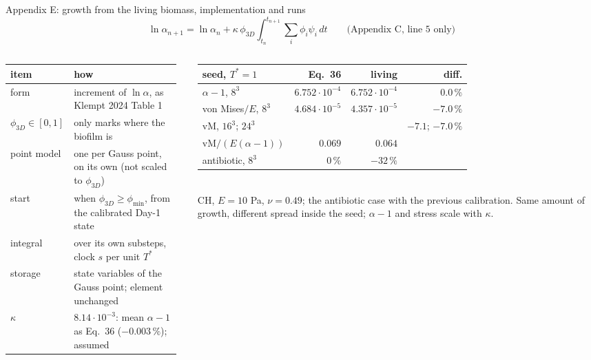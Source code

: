 \documentclass[aspectratio=169,11pt]{beamer}
\begin{document}
\begin{frame}{Appendix E: growth from the living biomass, implementation and runs}
\vspace{-6pt}
\[
\ln\alpha_{n+1}=\ln\alpha_n+\kappa\,\phi_{3D}\!\int_{t_n}^{t_{n+1}}\!\sum_i\phi_i\psi_i\,dt
\qquad\text{(Appendix C, line 5 only)}
\]
\vspace{-4pt}
\begin{columns}[T]
\begin{column}{0.42\textwidth}
\scriptsize\renewcommand{\arraystretch}{1.15}
\begin{tabular}{@{}>{\raggedright}p{0.3\linewidth}>{\raggedright\arraybackslash}p{0.66\linewidth}@{}}
\toprule
item & how\\
\midrule
form & increment of $\ln\alpha$, as Klempt 2024 Table 1\\
$\phi_{3D}\in[0,1]$ & only marks where the biofilm is\\
point model & one per Gauss point, on its own (not scaled to $\phi_{3D}$)\\
start & when $\phi_{3D}\ge\phi_{\min}$, from the calibrated Day-1 state\\
integral & over its own substeps, clock $s$ per unit $T^*$\\
storage & state variables of the Gauss point; element unchanged\\
$\kappa$ & $8.14\cdot10^{-3}$: mean $\alpha-1$ as Eq.\ 36 ($-0.003\,\%$); assumed\\
\bottomrule
\end{tabular}
\end{column}
\begin{column}{0.54\textwidth}
\scriptsize\setlength\tabcolsep{2pt}\renewcommand{\arraystretch}{1.15}
\begin{tabular}{@{}lrrr@{}}
\toprule
seed, $T^*=1$ & Eq.\ 36 & living & diff.\\
\midrule
$\alpha-1$, $8^3$ & $6.752\cdot10^{-4}$ & $6.752\cdot10^{-4}$ & $0.0\,\%$\\
von Mises$/E$, $8^3$ & $4.684\cdot10^{-5}$ & $4.357\cdot10^{-5}$ & $-7.0\,\%$\\
vM, $16^3$; $24^3$ & & & $-7.1$; $-7.0\,\%$\\
vM$/(E(\alpha-1))$ & $0.069$ & $0.064$ & \\
antibiotic, $8^3$ & $0\,\%$ & $-32\,\%$ & \\
\bottomrule
\end{tabular}\\[3pt]
CH, $E=10$ Pa, $\nu=0.49$; the antibiotic case with the previous calibration.
Same amount of growth, different spread inside the seed; $\alpha-1$ and stress scale with $\kappa$.
\end{column}
\end{columns}
\end{frame}
\end{document}
